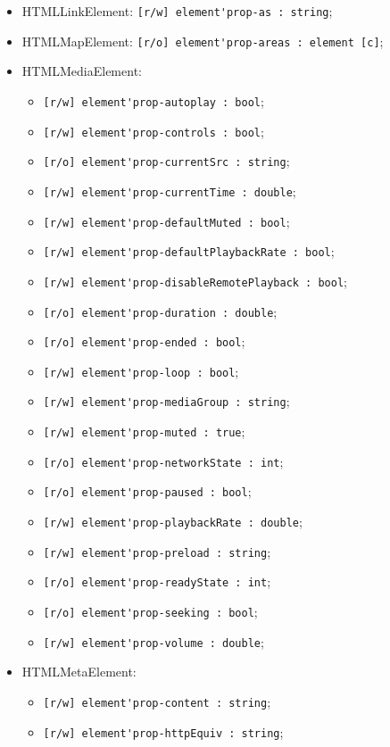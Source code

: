 \documentclass[a4paper, 14pt]{extarticle}
\newenvironment{icItems}
	{ \begin{itemize} [noitemsep,nolistsep] }
	{ \end{itemize} }
\begin{document}
\begin{icItems}
	\item HTMLLinkElement: \lstinline|[r/w] element'prop-as : string|;
	\item HTMLMapElement: \lstinline|[r/o] element'prop-areas : element [c]|;
	
	\item HTMLMediaElement:
	\begin{icItems}
		\item \lstinline|[r/w] element'prop-autoplay : bool|;
		\item \lstinline|[r/w] element'prop-controls : bool|;
		\item \lstinline|[r/o] element'prop-currentSrc : string|;
		\item \lstinline|[r/w] element'prop-currentTime : double|;
		\item \lstinline|[r/w] element'prop-defaultMuted : bool|;
		\item \lstinline|[r/w] element'prop-defaultPlaybackRate : bool|;
		\item \lstinline|[r/w] element'prop-disableRemotePlayback : bool|;
		\item \lstinline|[r/o] element'prop-duration : double|;
		\item \lstinline|[r/o] element'prop-ended : bool|;
		\item \lstinline|[r/w] element'prop-loop : bool|;
		\item \lstinline|[r/w] element'prop-mediaGroup : string|;
		\item \lstinline|[r/w] element'prop-muted : true|;
		\item \lstinline|[r/o] element'prop-networkState : int|;
		\item \lstinline|[r/o] element'prop-paused : bool|;
		\item \lstinline|[r/w] element'prop-playbackRate : double|;
		\item \lstinline|[r/w] element'prop-preload : string|;
		\item \lstinline|[r/o] element'prop-readyState : int|;
		\item \lstinline|[r/o] element'prop-seeking : bool|;
		\item \lstinline|[r/w] element'prop-volume : double|;
	\end{icItems}
	
	\item HTMLMetaElement:
	\begin{icItems}
		\item \lstinline|[r/w] element'prop-content : string|;
		\item \lstinline|[r/w] element'prop-httpEquiv : string|;
	\end{icItems}
	

\end{icItems}
\end{document}
